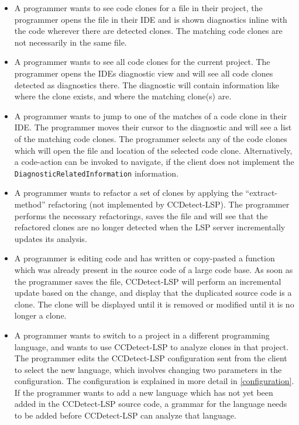 \begin{itemize} 

    \item A programmer wants to see code clones for a file in their project, the
        programmer opens the file in their IDE and is shown diagnostics inline with the
        code wherever there are detected clones. The matching code clones are not
        necessarily in the same file.

	\item A programmer wants to see all code clones for the current project. The
	      programmer opens the IDEs diagnostic view and will see all code clones detected
	      as diagnostics there. The diagnostic will contain information like where the clone
	      exists, and where the matching clone(s) are.

    \item A programmer wants to jump to one of the matches of a code clone in their IDE.
        The programmer moves their cursor to the diagnostic and will see a list of the
        matching code clones. The programmer selects any of the code clones which will
        open the file and location of the selected code clone. Alternatively, a
        code-action can be invoked to navigate, if the client does not implement the
        \verb|DiagnosticRelatedInformation| information.


      \item A programmer wants to refactor a set of clones by applying the
          ``extract-method'' refactoring (not implemented by CCDetect-LSP). The programmer
          performs the necessary refactorings, saves the file and will see that the
          refactored clones are no longer detected when the LSP server incrementally
          updates its analysis.

      \item A programmer is editing code and has written or copy-pasted a function which
          was already present in the source code of a large code base. As soon as the
          programmer saves the file, CCDetect-LSP will perform an incremental update based
          on the change, and display that the duplicated source code is a clone. The clone
          will be displayed until it is removed or modified until it is no longer a clone.

      \item A programmer wants to switch to a project in a different programming language,
          and wants to use CCDetect-LSP to analyze clones in that project. The programmer
          edits the CCDetect-LSP configuration sent from the client to select the new
          language, which involves changing two parameters in the configuration. The
          configuration is explained in more detail in \cref{configuration}. If the
          programmer wants to add a new language which has not yet been added in the
          CCDetect-LSP source code, a grammar for the language needs to be added before
          CCDetect-LSP can analyze that language.


\end{itemize}
